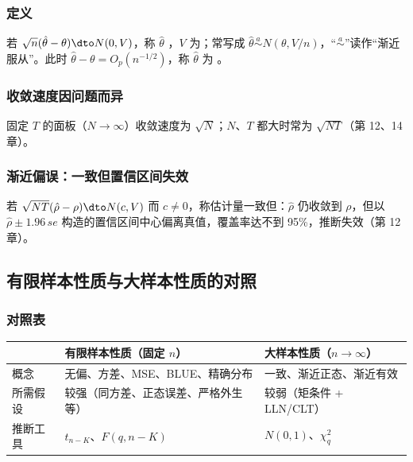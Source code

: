 \subsubsection{定义}

\begin{defn}\label{def:U01b-an}
若 $\sqrt n(\hat\theta-\theta)\dto N(0,V)$，称 $\hat\theta$ ，$V$ 为；常写成 $\hat\theta\overset{a}{\sim}N(\theta,V/n)$，“$\overset{a}{\sim}$”读作“渐近服从”。此时 $\hat\theta-\theta=O_p(n^{-1/2})$，称 $\hat\theta$ 为 。
\end{defn}

\subsubsection{收敛速度因问题而异}

固定 $T$ 的面板（$N\to\infty$）收敛速度为 $\sqrt N$；$N$、$T$ 都大时常为 $\sqrt{NT}$（第 12、14 章）。

\subsubsection{渐近偏误：一致但置信区间失效}

若 $\sqrt{NT}(\hat\rho-\rho)\dto N(c,V)$ 而 $c\ne0$，称估计量一致但：$\hat\rho$ 仍收敛到 $\rho$，但以 $\hat\rho\pm1.96\,se$ 构造的置信区间中心偏离真值，覆盖率达不到 95\%，推断失效（第 12 章）。

\subsection{有限样本性质与大样本性质的对照}

\subsubsection{对照表}

\begin{center}\begin{minipage}{\linewidth}\centering
\small
\begin{tabularx}{\linewidth}{lLL}
\toprule
 & 有限样本性质（固定 $n$） & 大样本性质（$n\to\infty$）\\
\midrule
概念 & 无偏、方差、MSE、BLUE、精确分布 & 一致、渐近正态、渐近有效\\
所需假设 & 较强（同方差、正态误差、严格外生等） & 较弱（矩条件 + LLN/CLT）\\
推断工具 & $t_{n-K}$、$F(q,n-K)$ & $N(0,1)$、$\chi^2_q$\\
\bottomrule
\end{tabularx}
\end{minipage}\end{center}

